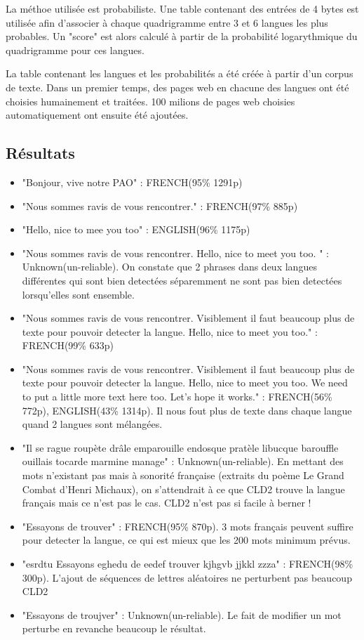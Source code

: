 	La méthoe utilisée est probabiliste. Une table contenant des entrées de 4 bytes est utilisée afin d'associer à chaque quadrigramme entre 3 et 6 langues les plus probables. Un "score" est alors calculé à partir de la probabilité logarythmique du quadrigramme pour ces langues.

	La table contenant les langues et les probabilités a été créée à partir d'un corpus de texte. Dans un premier temps, des pages web en chacune des langues ont été choisies humainement et traitées. 100 milions de pages web choisies automatiquement ont ensuite été ajoutées. 


\subsection{Résultats}

	\begin{itemize}
		\item "Bonjour, vive notre PAO" : FRENCH(95\% 1291p)
		\item "Nous sommes ravis de vous rencontrer." : FRENCH(97\% 885p)
		\item "Hello, nice to mee you too" :  ENGLISH(96\% 1175p)
		\item "Nous sommes ravis de vous rencontrer. Hello, nice to meet you too. " : Unknown(un-reliable). On constate que 2 phrases dans deux langues différentes qui sont bien detectées séparemment ne sont pas bien detectées lorsqu'elles sont ensemble.
		\item "Nous sommes ravis de vous rencontrer. Visiblement il faut beaucoup plus de texte pour pouvoir detecter la langue. Hello, nice to meet you too." : FRENCH(99\% 633p)
		\item "Nous sommes ravis de vous rencontrer. Visiblement il faut beaucoup plus de texte pour pouvoir detecter la langue. Hello, nice to meet you too. We need to put a little more text here too. Let's hope it works." : FRENCH(56\% 772p), ENGLISH(43\% 1314p). Il nous fout plus de texte dans chaque langue quand 2 langues sont mélangées.
		\item "Il se rague roupète drâle emparouille endosque pratèle libucque barouffle ouillais tocarde marmine manage" : Unknown(un-reliable). En mettant des mots n'existant pas mais à sonorité française (extraits du poème Le Grand Combat d'Henri Michaux), on s'attendrait à ce que CLD2 trouve la langue français mais ce n'est pas le cas. CLD2 n'est pas si facile à berner !
		\item "Essayons de trouver" : FRENCH(95\% 870p). 3 mots français peuvent suffire pour detecter la langue, ce qui est mieux que les 200 mots minimum prévus.
		\item "esrdtu Essayons eghedu de eedef trouver kjhgvb jjkkl zzza" : FRENCH(98\% 300p). L'ajout de séquences de lettres aléatoires ne perturbent pas beaucoup CLD2
		\item "Essayons de troujver" : Unknown(un-reliable). Le fait de modifier un mot perturbe en revanche beaucoup le résultat.
	\end{itemize}

	